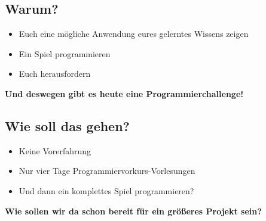 \subsection{Warum?}
\begin{frame}
    \slidehead
    \pause
    \begin{itemize}
        \item Euch eine mögliche Anwendung eures gelerntes Wissens zeigen
        \item Ein Spiel programmieren
        \item Euch herausfordern
    \end{itemize}
    \pause
    \vspace{\fill}
    \begin{center}
        \textbf{\huge Und deswegen gibt es heute eine Programmierchallenge!}
    \end{center}
    \vspace{\fill}
\end{frame}

\subsection{Wie soll das gehen?}
\begin{frame}
    \slidehead
    \begin{itemize}
        \item Keine Vorerfahrung
        \item Nur vier Tage Programmiervorkurs-Vorlesungen
        \item Und dann ein komplettes Spiel programmieren?
    \end{itemize}
    \pause
    \vspace{\fill}
    \begin{center}
        \textbf{\huge Wie sollen wir da schon bereit für ein größeres Projekt sein?}
    \end{center}
    \vspace{\fill}
\end{frame}

